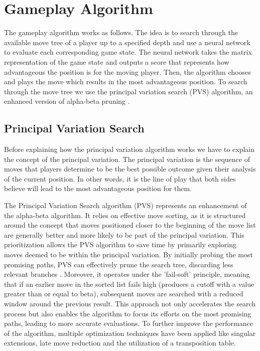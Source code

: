 \documentclass[letterpaper, 12pt]{article}
\begin{document}
\section*{Gameplay Algorithm}
The gameplay algorithm works as follows. The idea is to search through the available
move tree of a player up to a specified depth and use a neural network to evaluate each
corresponding game state. The neural network takes the matrix representation of the game
state and outputs a score that represents how advantageous the position is for the
moving player. Then, the algorithm chooses and plays the move which results in the most
advantageous position. To search through the move tree we use the principal variation
search (PVS) algorithm, an enhanced version of alpha-beta pruning \cite{Brud1963}.

\subsection*{Principal Variation Search}
Before explaining how the principal variation algorithm works we have to explain the
concept of the principal variation. The principal variation is the sequence of moves
that players determine to be the best possible outcome given their analysis of the
current position. In other words, it is the line of play that both sides believe will
lead to the most advantageous position for them.

The Principal Variation Search algorithm (PVS) \cite{Mar1982} represents an enhancement
of the alpha-beta algorithm. It relies on effective move sorting, as it is structured
around the concept that moves positioned closer to the beginning of the move list are
generally better and more likely to be part of the principal variation. This
prioritization allows the PVS algorithm to save time by primarily exploring moves deemed
to be within the principal variation. By initially probing the most promising paths, PVS
can effectively prune the search tree, discarding less relevant branches
\cite{Mar1985}. Moreover, it operates under the 'fail-soft' principle,
meaning that if an earlier move in the sorted list fails high (produces a cutoff with a
value greater than or equal to beta), subsequent moves are searched with a reduced
window around the previous result. This approach not only accelerates the search process
but also enables the algorithm to focus its efforts on the most promising paths, leading
to more accurate evaluations. To further improve the performance of the algorithm,
multiple optimization techniques have been applied like singular extensions, late move
reduction and the utilization of a transposition table.
\end{document}
